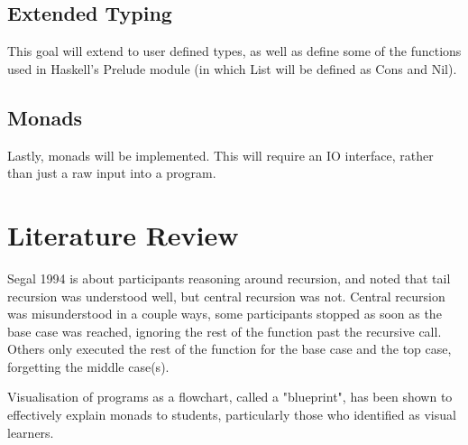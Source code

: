\documentclass[a4paper]{article}
\begin{document}
\subsection{Extended Typing}
This goal will extend to user defined types, as well as define some of the functions used in Haskell's Prelude module (in which List will be defined as Cons and Nil).
\subsection{Monads}
Lastly, monads will be implemented. This will require an IO interface, rather than just a raw input into a program.
\section{Literature Review}
Segal 1994 \cite{segal1994empirical} is about participants reasoning around recursion, and noted that tail recursion was understood well, but central recursion was not.
Central recursion was misunderstood in a couple ways, some participants stopped as soon as the base case was reached, ignoring the rest of the function past the recursive call.
Others only executed the rest of the function for the base case and the top case, forgetting the middle case(s).

Visualisation of programs as a flowchart, called a "blueprint", \cite{steenvoorden2017visual} has been shown to effectively explain monads to students, particularly those who identified as visual learners.

\printbibliography
\end{document}

